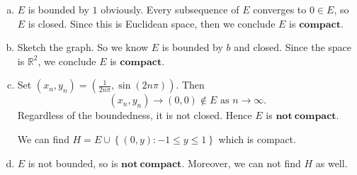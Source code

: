\begin{Exercise}
\begin{enumerate}[a)]
\item
\begin{solution}
$E$ is bounded by $1$ obviously. Every subsequence of $E$ converges to $0\in E$, so $E$ is closed. Since this is Euclidean space, then we conclude $E$ is $\mathbf{compact}$.
\end{solution}

\item 
\begin{solution}
Sketch the graph. So we know $E$ is bounded by $b$ and closed. Since the space is $\mathbb{R}^2$, we conclude $E$ is $\mathbf{compact}$.
\end{solution}

\item
\begin{solution}
Set $(x_n, y_n) = \left(\frac{1}{2n\pi}, \sin(2n\pi)\right)$. Then
$$
(x_n,y_n)\to (0,0)\notin E\text{ as }n\to\infty.
$$
Regardless of the boundedness, it is not closed. Hence $E$ is $\mathbf{not\ compact}$.

We can find $H = E\cup\left\{(0,y):-1\leq y \leq 1\right\}$ which is compact.
\end{solution}

\item
\begin{solution}
$E$ is not bounded, so is $\mathbf{not\ compact}$. Moreover, we can not find $H$ as well.
\end{solution}
\end{enumerate}
\end{Exercise}